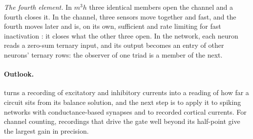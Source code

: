\documentclass[11pt]{article}
\theoremstyle{definition}\newtheorem{definition}[theorem]{Definition}
\theoremstyle{remark}\newtheorem{remark}[theorem]{Remark}
\begin{document}
\emph{The fourth element.} In $m^3h$ three identical members open the channel and a fourth closes it. In the channel, three sensors move together and fast, and the fourth moves later and is, on its own, sufficient and rate limiting for fast inactivation \cite{ChandaBezanilla,Capes}: it closes what the other three open. In the network, each neuron reads a zero-sum ternary input, and its output becomes an entry of other neurons' ternary rows: the observer of one triad is a member of the next.

\paragraph{Outlook.}  turns a recording of excitatory and inhibitory currents into a reading of how far a circuit sits from its balance solution, and the next step is to apply it to spiking networks with conductance-based synapses and to recorded cortical currents. For channel counting, recordings that drive the gate well beyond its half-point give the largest gain in precision.
\end{document}

